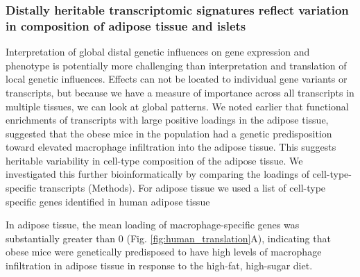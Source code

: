 \documentclass[
]{article}
\begin{document}
\subsubsection{Distally heritable transcriptomic signatures reflect
variation in composition of adipose tissue and
islets}\label{distally-heritable-transcriptomic-signatures-reflect-variation-in-composition-of-adipose-tissue-and-islets}

Interpretation of global distal genetic influences on gene expression
and phenotype is potentially more challenging than interpretation and
translation of local genetic influences. Effects can not be located to
individual gene variants or transcripts, but because we have a measure
of importance across all transcripts in multiple tissues, we can look at
global patterns. We noted earlier that functional enrichments of
transcripts with large positive loadings in the adipose tissue,
suggested that the obese mice in the population had a genetic
predisposition toward elevated macrophage infiltration into the adipose
tissue. This suggests heritable variability in cell-type composition of
the adipose tissue. We investigated this further bioinformatically by
comparing the loadings of cell-type-specific transcripts (Methods). For
adipose tissue we used a list of cell-type specific genes identified in
human adipose tissue

In adipose tissue, the mean loading of macrophage-specific genes was
substantially greater than 0 (Fig. \ref{fig:human_translation}A),
indicating that obese mice were genetically predisposed to have high
levels of macrophage infiltration in adipose tissue in response to the
high-fat, high-sugar diet.
\end{document}
